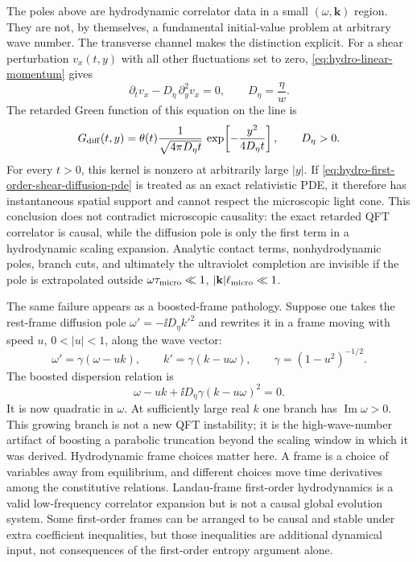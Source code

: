 The poles above are hydrodynamic correlator data in a small
\((\omega,\mathbf k)\) region.  They are not, by themselves, a fundamental
initial-value problem at arbitrary wave number.  The transverse channel makes
the distinction explicit.  For a shear perturbation
\(v_x(t,y)\) with all other fluctuations set to zero,
\eqref{eq:hydro-linear-momentum} gives
\begin{equation}
  \partial_t v_x-D_\eta\,\partial_y^2v_x=0,
  \qquad
  D_\eta=\frac{\eta}{w}.
  \label{eq:hydro-first-order-shear-diffusion-pde}
\end{equation}
The retarded Green function of this equation on the line is
\begin{equation}
  G_{\rm diff}(t,y)
  =
  \theta(t)\frac{1}{\sqrt{4\pi D_\eta t}}\,
  \exp\!\left[-\frac{y^2}{4D_\eta t}\right],
  \qquad D_\eta>0.
  \label{eq:hydro-shear-heat-kernel}
\end{equation}
For every \(t>0\), this kernel is nonzero at arbitrarily large \(|y|\).  If
\eqref{eq:hydro-first-order-shear-diffusion-pde} is treated as an exact
relativistic PDE, it therefore has instantaneous spatial support and cannot
respect the microscopic light cone.  This conclusion does not contradict
microscopic causality: the exact retarded QFT correlator is causal, while the
diffusion pole is only the first term in a hydrodynamic scaling expansion.
Analytic contact terms, nonhydrodynamic poles, branch cuts, and ultimately the
ultraviolet completion are invisible if the pole is extrapolated outside
\(\omega\tau_{\rm micro}\ll1\), \(|\mathbf k|\ell_{\rm micro}\ll1\).

The same failure appears as a boosted-frame pathology.  Suppose one takes the
rest-frame diffusion pole
\(\omega'=-\ii D_\eta k'^2\) and rewrites it in a frame moving with speed
\(u\), \(0<|u|<1\), along the wave vector:
\[
  \omega'=\gamma(\omega-uk),
  \qquad
  k'=\gamma(k-u\omega),
  \qquad
  \gamma=(1-u^2)^{-1/2}.
\]
The boosted dispersion relation is
\begin{equation}
  \omega-uk+\ii D_\eta\gamma(k-u\omega)^2=0 .
  \label{eq:hydro-boosted-diffusion-dispersion}
\end{equation}
It is now quadratic in \(\omega\).  At sufficiently large real \(k\) one
branch has \(\operatorname{Im}\omega>0\).  This growing branch is not a new QFT
instability; it is the high-wave-number artifact of boosting a parabolic
truncation beyond the scaling window in which it was derived.  Hydrodynamic
frame choices matter here.  A frame is a choice of variables away from
equilibrium, and different choices move time derivatives among the
constitutive relations.  Landau-frame first-order hydrodynamics is a valid
low-frequency correlator expansion but is not a causal global evolution
system.  Some first-order frames can be arranged to be causal and stable under extra
coefficient inequalities, but those inequalities are additional dynamical
input, not consequences of the first-order entropy argument alone.

